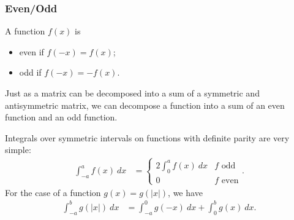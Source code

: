 \documentclass[10pt]{mypackage}
\begin{document}
\subsubsection{Even/Odd}%
\begin{definition}
A function $f(x)$ is
\begin{itemize}
  \item even if $f(-x) = f(x)$;
  \item odd if $f(-x) = -f(x)$.
\end{itemize}
\end{definition}
Just as a matrix can be decomposed into a sum of a symmetric and antisymmetric matrix, we can decompose a function into a sum of an even function and an odd function.\newline

Integrals over symmetric intervals on functions with definite parity are very simple:
\begin{align*}
  \int_{-a}^{a} f(x)\:dx &= \begin{cases}
    2\int_{0}^{a} f(x)\:dx & f\text{ odd}\\
    0 & f\text{ even}
  \end{cases}.
\end{align*}
For the case of a function $g\left(x\right) = g\left(|x|\right)$, we have
\begin{align*}
  \int_{-a}^{b} g\left(|x|\right)\:dx &= \int_{-a}^{0} g(-x)\:dx + \int_{0}^{b} g(x)\:dx.
\end{align*}
\end{document}
